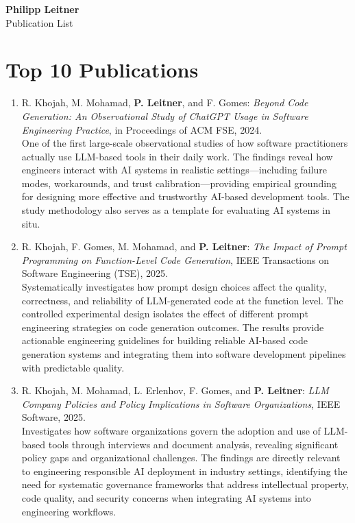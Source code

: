 \documentclass[a4paper,11pt]{article}
\begin{document}
\begin{center}
{\LARGE\bfseries Philipp Leitner}\\[0.3em]
{\normalsize Publication List}
\end{center}

\section{Top 10 Publications}

\begin{enumerate}[leftmargin=2em,itemsep=0.7em]

\item R. Khojah, M. Mohamad, \textbf{P. Leitner}, and F. Gomes: \emph{Beyond Code Generation: An Observational Study of ChatGPT Usage in Software Engineering Practice}, in Proceedings of ACM FSE, 2024.\\
{\small One of the first large-scale observational studies of how software practitioners actually use LLM-based tools in their daily work. The findings reveal how engineers interact with AI systems in realistic settings---including failure modes, workarounds, and trust calibration---providing empirical grounding for designing more effective and trustworthy AI-based development tools. The study methodology also serves as a template for evaluating AI systems in situ.}

\item R. Khojah, F. Gomes, M. Mohamad, and \textbf{P. Leitner}: \emph{The Impact of Prompt Programming on Function-Level Code Generation}, IEEE Transactions on Software Engineering (TSE), 2025.\\
{\small Systematically investigates how prompt design choices affect the quality, correctness, and reliability of LLM-generated code at the function level. The controlled experimental design isolates the effect of different prompt engineering strategies on code generation outcomes. The results provide actionable engineering guidelines for building reliable AI-based code generation systems and integrating them into software development pipelines with predictable quality.}

\item R. Khojah, M. Mohamad, L. Erlenhov, F. Gomes, and \textbf{P. Leitner}: \emph{LLM Company Policies and Policy Implications in Software Organizations}, IEEE Software, 2025.\\
{\small Investigates how software organizations govern the adoption and use of LLM-based tools through interviews and document analysis, revealing significant policy gaps and organizational challenges. The findings are directly relevant to engineering responsible AI deployment in industry settings, identifying the need for systematic governance frameworks that address intellectual property, code quality, and security concerns when integrating AI systems into engineering workflows.}


\end{enumerate}
\end{document}
